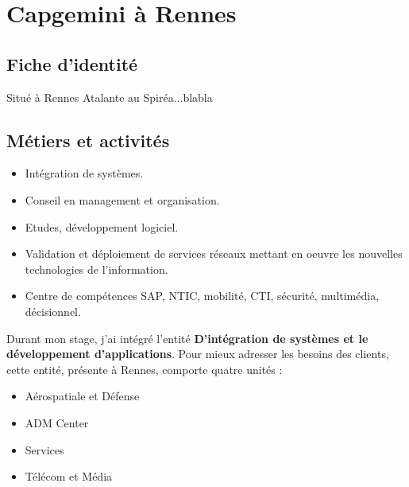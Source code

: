 \chapter{Capgemini à Rennes}
\section{Fiche d'identité}
Situé à Rennes Atalante au Spiréa...blabla
\section{Métiers et activités}
\begin{itemize}
\item Intégration de systèmes.
\item Conseil en management et organisation.
\item Etudes, développement logiciel.
\item Validation et déploiement de services réseaux mettant en oeuvre les nouvelles technologies de l'information.
\item Centre de compétences SAP, NTIC, mobilité, CTI, sécurité, multimédia, décisionnel.
\end{itemize}

Durant mon stage, j’ai intégré l’entité \textbf{D'intégration de systèmes et le développement d'applications}.
Pour mieux adresser les besoins des clients, cette entité, présente à Rennes, comporte quatre unités :
\begin{itemize}
\item Aérospatiale et Défense
\item ADM Center
\item Services
\item Télécom et Média
\end{itemize}
